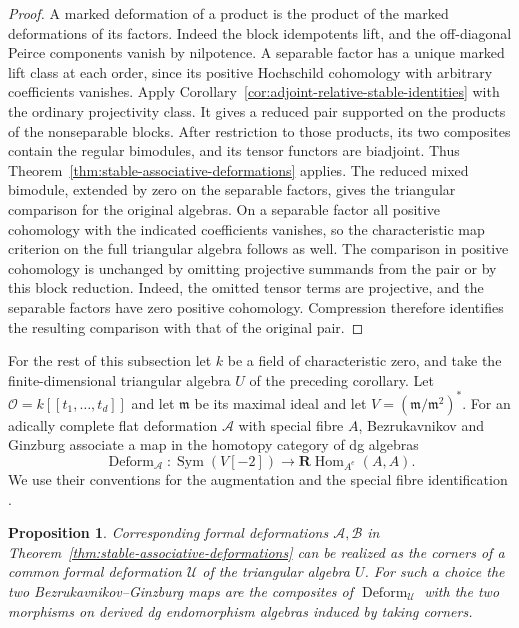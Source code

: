 \documentclass[12pt,a4paper,english,reqno]{amsart}
\numberwithin{equation}{section}
\theoremstyle{plain}
\newtheorem{proposition}[theorem]{Proposition}
\theoremstyle{definition}
\begin{document}
\begin{proof}
A marked deformation of a product is the product of the
marked deformations of its factors. Indeed the block idempotents
lift, and the off-diagonal Peirce components vanish by
nilpotence. A separable factor has a unique marked lift class
at each order, since its positive Hochschild cohomology
with arbitrary coefficients vanishes. Apply Corollary~\ref{cor:adjoint-relative-stable-identities}
with the ordinary projectivity class. It gives a reduced pair
supported on the products of the nonseparable blocks. After
restriction to those products, its two composites contain the
regular bimodules, and its tensor functors are biadjoint.
Thus Theorem~\ref{thm:stable-associative-deformations} applies.
The reduced mixed bimodule, extended by zero on the separable
factors, gives the triangular comparison for the original
algebras. On a separable factor all positive cohomology with
the indicated coefficients vanishes, so the characteristic
map criterion on the full triangular algebra follows as well.
The comparison in positive cohomology is unchanged by omitting
projective summands from the pair or by this block reduction.
Indeed, the omitted tensor terms are projective, and the
separable factors have zero positive cohomology. Compression
therefore identifies the resulting comparison with that of
the original pair.
\end{proof}

For the rest of this subsection let $k$ be a field of characteristic
zero, and take the finite-dimensional triangular algebra $U$ of the
preceding corollary. Let $\mathcal O=k[[t_1,\ldots,t_d]]$ and let
$\mathfrak m$ be its
maximal ideal and let $V=(\mathfrak m/\mathfrak m^2)^*$.
For an adically complete flat deformation $\mathcal A$ with
special fibre $A$, Bezrukavnikov and Ginzburg associate a map
in the homotopy category of dg algebras
\[
 \operatorname{Deform}_{\mathcal A}:
 \operatorname{Sym}(V[-2])\longrightarrow
 \mathbf R\operatorname{Hom}_{A^e}(A,A).
\]
We use their conventions for the augmentation and the special
fibre identification \cite[Theorem~1.2.3]{BezrukavnikovGinzburg2007}.

\begin{proposition}\label{prop:bg-triangular-deformations}
Corresponding formal deformations $\mathcal A,\mathcal B$
in Theorem~\ref{thm:stable-associative-deformations} can be
realized as the corners of a common formal deformation
$\mathcal U$ of the triangular algebra $U$. For such a choice
the two Bezrukavnikov--Ginzburg maps are the composites of
$\operatorname{Deform}_{\mathcal U}$ with the two morphisms on
derived dg endomorphism algebras induced by taking corners.
\end{proposition}
\end{document}
